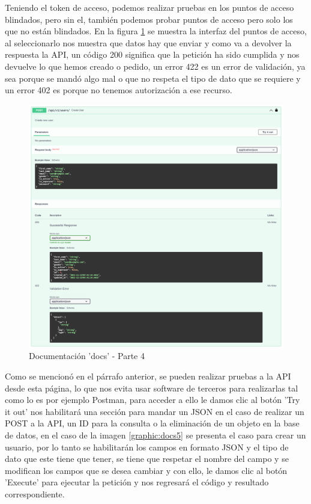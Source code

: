 Teniendo el token de acceso, podemos realizar pruebas en los puntos de acceso blindados, pero sin el, también podemos probar puntos de acceso pero solo los que no están blindados. En la figura \ref{graphic:docs4} se muestra la interfaz del puntos de acceso, al seleccionarlo nos muestra que datos hay que enviar y como va a devolver la respuesta la API, un código 200 significa que la petición ha sido cumplida y nos devuelve lo que hemos creado o pedido, un error 422 es un error de validación, ya sea porque se mandó algo mal o que no respeta el tipo de dato que se requiere y un error 402 es porque no tenemos autorización a ese recurso.

\begin{figure}[!htb]
    \centering
    \includegraphics[scale=.20]{TT/img/implementacion/docs_4.png}
    \caption{Documentación 'docs' - Parte 4}
    \label{graphic:docs4}
\end{figure}

Como se mencionó en el párrafo anterior, se pueden realizar pruebas a la API desde esta página, lo que nos evita usar software de terceros para realizarlas tal como lo es por ejemplo Postman, para acceder a ello le damos clic al botón 'Try it out' nos habilitará una sección para mandar un JSON en el caso de realizar un POST a la API, un ID para la consulta o la eliminación de un objeto en la base de datos, en el caso de la imagen \ref{graphic:docs5} se presenta el caso para crear un usuario, por lo tanto se habilitarán los campos en formato JSON y el tipo de dato que este tiene que tener, se tiene que respetar el nombre del campo y se modifican los campos que se desea cambiar y  con ello, le damos clic al botón 'Execute' para ejecutar la petición y nos regresará el código y resultado correspondiente.

